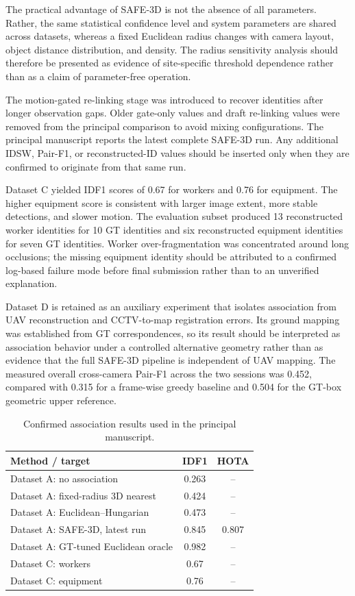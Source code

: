 The practical advantage of SAFE-3D is not the absence of all parameters. Rather, the same statistical confidence level and system parameters are shared across datasets, whereas a fixed Euclidean radius changes with camera layout, object distance distribution, and density. The radius sensitivity analysis should therefore be presented as evidence of site-specific threshold dependence rather than as a claim of parameter-free operation.

The motion-gated re-linking stage was introduced to recover identities after longer observation gaps. Older gate-only values and draft re-linking values were removed from the principal comparison to avoid mixing configurations. The principal manuscript reports the latest complete SAFE-3D run. Any additional IDSW, Pair-F1, or reconstructed-ID values should be inserted only when they are confirmed to originate from that same run.

Dataset C yielded IDF1 scores of 0.67 for workers and 0.76 for equipment. The higher equipment score is consistent with larger image extent, more stable detections, and slower motion. The evaluation subset produced 13 reconstructed worker identities for 10 GT identities and six reconstructed equipment identities for seven GT identities. Worker over-fragmentation was concentrated around long occlusions; the missing equipment identity should be attributed to a confirmed log-based failure mode before final submission rather than to an unverified explanation.

Dataset D is retained as an auxiliary experiment that isolates association from UAV reconstruction and CCTV-to-map registration errors. Its ground mapping was established from GT correspondences, so its result should be interpreted as association behavior under a controlled alternative geometry rather than as evidence that the full SAFE-3D pipeline is independent of UAV mapping. The measured overall cross-camera Pair-F1 across the two sessions was 0.452, compared with 0.315 for a frame-wise greedy baseline and 0.504 for the GT-box geometric upper reference.

\begin{table}[t]
\centering
\caption{Confirmed association results used in the principal manuscript.}
\label{tab:association}
\begin{tabular}{p{3.9cm}cc}
\toprule
Method / target & IDF1 & HOTA \\
\midrule
Dataset A: no association & 0.263 & -- \\
Dataset A: fixed-radius 3D nearest & 0.424 & -- \\
Dataset A: Euclidean--Hungarian & 0.473 & -- \\
Dataset A: SAFE-3D, latest run & 0.845 & 0.807 \\
Dataset A: GT-tuned Euclidean oracle & 0.982 & -- \\
Dataset C: workers & 0.67 & -- \\
Dataset C: equipment & 0.76 & -- \\
\bottomrule
\end{tabular}
\end{table}

